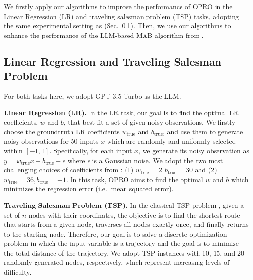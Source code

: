 
We firstly apply our algorithms to improve the performance of OPRO in the Linear Regression (LR) and traveling salesman problem (TSP) tasks, adopting the same experimental setting as \citet{yang2023large} (Sec.~\ref{subsec:exp:opro}).
Then, we use our algorithms to enhance the performance of the LLM-based MAB algorithm from \citet{krishnamurthy2024can}.

\subsection{Linear Regression and Traveling Salesman Problem}
\label{subsec:exp:opro}
For both tasks here, we adopt GPT-3.5-Turbo as the LLM.

\textbf{Linear Regression (LR).}
In the LR task, our goal is to find the optimal LR coefficients, $w$ and $b$, that best fit a set of given noisy observations. We firstly choose the groundtruth LR coefficients $w_{\text{true}}$ and $b_{\text{true}}$, and use them to generate noisy observations for 50 inputs $x$ which are randomly and uniformly selected within $[-1, 1]$.
Specifically, for each input $x$, we generate its noisy observation as $y = w_{\text{true}} x + b_{\text{true}} + \epsilon$ where $\epsilon$ is a Gaussian noise.
We adopt the two most challenging choices of coefficients from \citet{yang2023large}: (1) $w_{\text{true}}=2,b_{\text{true}}=30$ and (2) $w_{\text{true}}=36,b_{\text{true}}=-1$.
In this task, OPRO aims to find the optimal $w$ and $b$ which minimizes the regression error (i.e., mean squared error).


\textbf{Traveling Salesman Problem (TSP).}
In the classical TSP problem \cite{junger1995traveling}, given a set of $n$ nodes with their coordinates, the objective is to find the shortest route that starts from a given node, traverses all nodes exactly once, and finally returns to the starting node.
Therefore, our goal is to solve a discrete optimization problem in which the input variable is a trajectory and the goal is to minimize the total distance of the trajectory.
We adopt TSP instances with 10, 15, and 20 randomly generated nodes, respectively, which represent increasing levels of difficulty.


